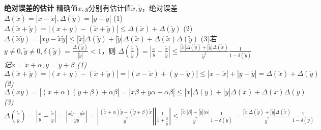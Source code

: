 \documentclass[11pt]{article}
\begin{document}
\textbf{绝对误差的估计} \newline
精确值$x,y$分别有估计值$\tilde{x},\tilde{y}$，绝对误差$\Delta(\tilde{x})=|x-\tilde{x}|,\Delta(\tilde{y})=|y-\tilde{y}|$ \newline
(1)$\Delta(\tilde{x}+\tilde{y})=|(x+y)-(\tilde{x}+\tilde{y})|\le\Delta(\tilde{x})+\Delta(\tilde{y})$ \newline
(2)$\Delta(\tilde{x}\tilde{y})=|xy-\tilde{x}\tilde{y}|\le |\tilde{x}|\Delta(\tilde{y})+|\tilde{y}|\Delta(\tilde{x})+\Delta(\tilde{x})\Delta(\tilde{y})$ \newline
(3)若$y\not=0,\tilde{y}\not=0,\delta(\tilde{y})=\frac{\Delta(\tilde{y})}{|\tilde{y}|}<1$，则  \newline
$\Delta(\frac{\tilde{x}}{\tilde{y}})=|\frac{x}{y}-\frac{\tilde{x}}{\tilde{y}}|\le \frac{|\tilde{x}|\Delta(\tilde{y})+ |\tilde{y}|\Delta(\tilde{x})}{\tilde{y}^2} \frac{1}{1-\delta(\tilde{y})}$ \newline
\textit{记$x=\tilde{x}+\alpha, y=\tilde{y}+\beta$ \newline
(1)$\Delta(\tilde{x}+\tilde{y})=|(x+y)-(\tilde{x}+\tilde{y})|=|(x-\tilde{x})+(y-\tilde{y})|\le |x-\tilde{x}|+|y-\tilde{y}|=\Delta(\tilde{x})+\Delta(\tilde{y})$ \newline
(2)$\Delta(\tilde{x}\tilde{y})=|(\tilde{x}+\alpha)(\tilde{y}+\beta)+\alpha\beta|=|\tilde{x}\beta+\tilde{y}\alpha+\alpha\beta|\le |\tilde{x}|\Delta(\tilde{y})+|\tilde{y}|\Delta(\tilde{x})+\Delta(\tilde{x})\Delta(\tilde{y})$ \newline
(3)$\Delta(\frac{\tilde{x}}{\tilde{y}})=|\frac{x}{y}-\frac{\tilde{x}}{\tilde{y}}|=|\frac{x\tilde{y}-y\tilde{x}}{y\tilde{y}}|=|\frac{(\tilde{x}+\alpha)\tilde{y}-(\tilde{y}+\beta)\tilde{x}}{\tilde{y}^2}||\frac{1}{1+\frac{\beta}{\tilde{y}}}|\le \frac{|\tilde{x}||\beta|+|\tilde{y}||\alpha|}{\tilde{y}^2} \frac{1}{1-\delta(\tilde{y})}=\frac{|\tilde{x}|\Delta(\tilde{y})+ |\tilde{y}|\Delta(\tilde{x})}{\tilde{y}^2} \frac{1}{1-\delta(\tilde{y})}$
} \newline
\end{document}
